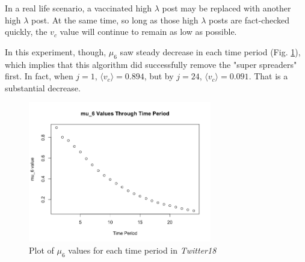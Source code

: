 \documentclass[preprint,review,12pt]{elsarticle}
\begin{document}
In a real life scenario, a vaccinated high $\lambda$ post may be replaced with another high $\lambda$ post. At the same time, so long as those high $\lambda$ posts are fact-checked quickly, the $v_c$ value will continue to remain as low as possible. 

In this experiment, though, $\mu_6$ saw steady decrease in each time period (Fig. \ref{fig:mu6 Twitter18}), which implies that this algorithm did successfully remove the "super spreaders" first. In fact, when $j=1$, $\langle v_c \rangle = 0.894$, but by $j=24$, $\langle v_c \rangle = 0.091$. That is a substantial decrease.
\begin{figure}[h!]
    \centering
    \includegraphics[width=8cm]{mu6 graph.png}
    \caption{Plot of $\mu_6$ values for each time period in \textit{Twitter18}}
    \label{fig:mu6 Twitter18}
\end{figure}
 
\end{document}

